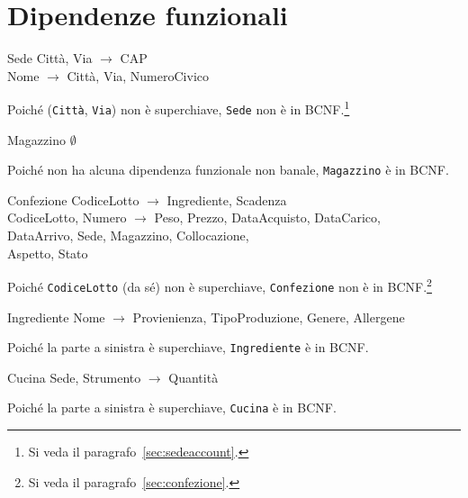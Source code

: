 \section{Dipendenze funzionali}\label{sec:functionaldependencies}
\begin{samepage}
\begin{funcdep}{Sede}
    Città, Via $\to$ CAP\\
    Nome $\to$ Città, Via, NumeroCivico
\end{funcdep}
Poiché ({\tt Città}, {\tt Via}) non è superchiave, {\tt Sede} non
è in BCNF.\footnote{Si veda il paragrafo~\vref{sec:sedeaccount}.}
\end{samepage}

\begin{samepage}
\begin{funcdep}{Magazzino}
    $\emptyset$
\end{funcdep}
Poiché non ha alcuna dipendenza funzionale non banale, {\tt Magazzino} è in BCNF.
\end{samepage}

\begin{samepage}
\begin{funcdep}{Confezione}
    CodiceLotto $\to$ Ingrediente, Scadenza\\
    CodiceLotto, Numero $\to$ Peso, Prezzo, DataAcquisto, DataCarico,\\
        \indent\indent\indent\indent\indent DataArrivo, Sede, Magazzino, Collocazione,\\
        \indent\indent\indent\indent\indent Aspetto, Stato
\end{funcdep}
Poiché {\tt CodiceLotto} (da sé) non è superchiave, {\tt Confezione} non è in BCNF.\footnote{Si veda il paragrafo~\vref{sec:confezione}.}
\end{samepage}

\begin{samepage}
\begin{funcdep}{Ingrediente}
    Nome $\to$ Provienienza, TipoProduzione, Genere, Allergene
\end{funcdep}
Poiché la parte a sinistra è superchiave, {\tt Ingrediente} è in BCNF.
\end{samepage}

\begin{samepage}
\begin{funcdep}{Cucina}
    Sede, Strumento $\to$ Quantità
\end{funcdep}
Poiché la parte a sinistra è superchiave, {\tt Cucina} è in BCNF.
\end{samepage}

